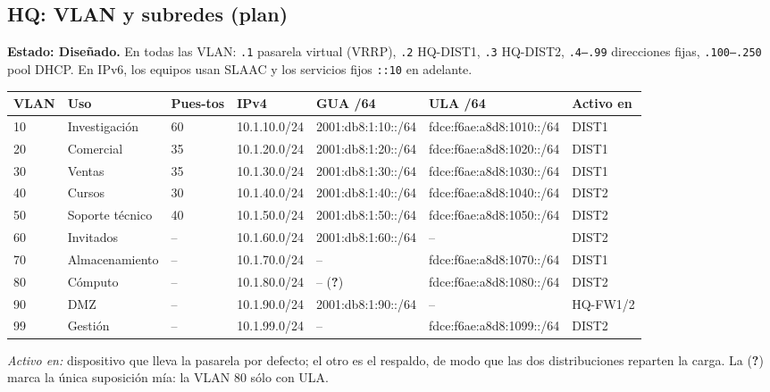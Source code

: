 \documentclass[11pt,a4paper]{article}
\newcommand{\cod}[1]{\texttt{#1}}
\newcommand{\dis}{\textcolor{azul}{\textbf{Diseñado}}}
\begin{document}
\subsection{HQ: VLAN y subredes (plan)}
\textbf{Estado: \dis.} En todas las VLAN: \cod{.1} pasarela virtual (VRRP), \cod{.2} HQ-DIST1, \cod{.3} HQ-DIST2, \cod{.4--.99} direcciones fijas, \cod{.100--.250} pool DHCP. En IPv6, los equipos usan SLAAC y los servicios fijos \cod{::10} en adelante.
\begingroup\footnotesize
\begin{longtable}{@{}p{0.8cm}p{2.4cm}p{0.9cm}p{2.1cm}p{3.2cm}p{4.1cm}p{1.7cm}@{}}
\toprule
\textbf{VLAN} & \textbf{Uso} & \textbf{Pues-tos} & \textbf{IPv4} & \textbf{GUA /64} & \textbf{ULA /64} & \textbf{Activo en}\\
\midrule
\endhead
10 & Investigación & 60 & 10.1.10.0/24 & 2001:db8:1:10::/64 & fdce:f6ae:a8d8:1010::/64 & DIST1\\
20 & Comercial & 35 & 10.1.20.0/24 & 2001:db8:1:20::/64 & fdce:f6ae:a8d8:1020::/64 & DIST1\\
30 & Ventas & 35 & 10.1.30.0/24 & 2001:db8:1:30::/64 & fdce:f6ae:a8d8:1030::/64 & DIST1\\
40 & Cursos & 30 & 10.1.40.0/24 & 2001:db8:1:40::/64 & fdce:f6ae:a8d8:1040::/64 & DIST2\\
50 & Soporte técnico & 40 & 10.1.50.0/24 & 2001:db8:1:50::/64 & fdce:f6ae:a8d8:1050::/64 & DIST2\\
60 & Invitados & -- & 10.1.60.0/24 & 2001:db8:1:60::/64 & -- & DIST2\\
70 & Almacenamiento & -- & 10.1.70.0/24 & -- & fdce:f6ae:a8d8:1070::/64 & DIST1\\
80 & Cómputo & -- & 10.1.80.0/24 & -- (\textbf{?}) & fdce:f6ae:a8d8:1080::/64 & DIST2\\
90 & DMZ & -- & 10.1.90.0/24 & 2001:db8:1:90::/64 & -- & HQ-FW1/2\\
99 & Gestión & -- & 10.1.99.0/24 & -- & fdce:f6ae:a8d8:1099::/64 & DIST2\\
\bottomrule
\end{longtable}
\endgroup
\textit{Activo en:} dispositivo que lleva la pasarela por defecto; el otro es el respaldo, de modo que las dos distribuciones reparten la carga. La (\textbf{?}) marca la única suposición mía: la VLAN 80 sólo con ULA.
\end{document}
